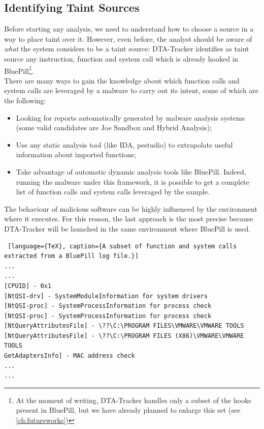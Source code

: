 \documentclass[LaM,binding=0.6cm]{sapthesis}
\begin{document}
\subsection{Identifying Taint Sources}
\label{subsec:identifyingtaintsources}
Before starting any analysis, we need to understand how to choose a source in a way to place taint over it. However, even before, the analyst should be aware of \textit{what} the system considers to be a taint source: {\sf DTA-Tracker} identifies as taint source any instruction, function and system call which is already hooked in BluePill\footnote{At the moment of writing, {\sf DTA-Tracker} handles only a subset of the hooks present in BluePill, but we have already planned to enlarge this set (see \autoref{ch:futureworks})}.\\

There are many ways to gain the knowledge about which function calls and system calls are leveraged by a malware to carry out its intent, some of which are the following:
\begin{itemize}
\item Looking for reports automatically generated by malware analysis systems (some valid candidates are Joe Sandbox and Hybrid Analysis);
\item Use any static analysis tool (like IDA, pestudio) to extrapolate useful information about imported functions;
\item Take advantage of automatic dynamic analysis tools like BluePill. Indeed, running the malware under this framework, it is possible to get a complete list of function calls and system calls leveraged by the sample. 
\end{itemize}
The behaviour of malicious software can be highly influenced by the environment where it executes. For this reason, the last approach is the most precise because {\sf DTA-Tracker} will be launched in the same environment where BluePill is used.
\begin{lstlisting} [language={TeX}, caption={A subset of function and system calls extracted from a BluePill log file.}]
...
...
[CPUID] - 0x1
[NtQSI-drv] - SystemModuleInformation for system drivers
[NtQSI-proc] - SystemProcessInformation for process check
[NtQSI-proc] - SystemProcessInformation for process check
[NtQueryAttributesFile] - \??\C:\PROGRAM FILES\VMWARE\VMWARE TOOLS
[NtQueryAttributesFile] - \??\C:\PROGRAM FILES (X86)\VMWARE\VMWARE TOOLS
GetAdaptersInfo] - MAC address check
...
...
\end{lstlisting}
\end{document}
